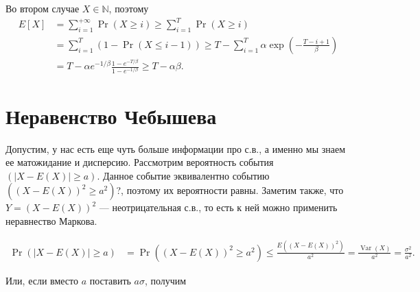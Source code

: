 \documentclass[12pt]{article}
\newcommand\N{\mathbb{N}}
\DeclareMathOperator{\Var}{Var}
\begin{document}
Во втором случае $X \in \N$, поэтому
\begin{align*}
  E[X] &= \sum_{i = 1}^{+\infty} \Pr(X \ge i) \ge \sum_{i = 1}^{T} \Pr(X \ge i) \\
       &= \sum_{i = 1}^T (1 - \Pr(X \le i - 1)) \ge T - \sum_{i = 1}^{T} \alpha\exp\left(-\frac{T - i + 1}{\beta}\right) \\
       &= T - \alpha e^{-1/\beta} \frac{1 - e^{-T/\beta}}{1 - e^{-1/\beta}} \ge T - \alpha\beta. 
\end{align*}

\section{Неравенство Чебышева}

Допустим, у нас есть еще чуть больше информации про с.в., а именно мы знаем ее матожидание и дисперсию. Рассмотрим вероятность события $(|X - E(X)| \ge a)$. Данное событие эквивалентно событию $((X - E(X))^2 \ge a^2)$?, поэтому их вероятности равны. Заметим также, что $Y = (X - E(X))^2$ --- неотрицательная с.в., то есть к ней можно применить неравнество Маркова.

\begin{align*}
  \Pr(|X - E(X)| \ge a) &= \Pr((X - E(X))^2 \ge a^2) \le \frac{E((X - E(X))^2)}{a^2} = \frac{\Var(X)}{a^2} = \frac{\sigma^2}{a^2}.
\end{align*}

\begin{center}
\end{center}

Или, если вместо $a$ поставить $a\sigma$, получим


\begin{center}
\end{center}
\end{document}
